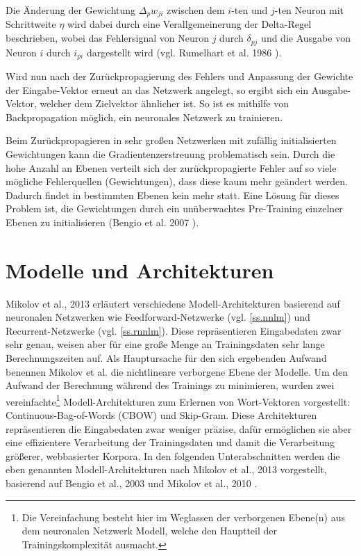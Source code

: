 Die Änderung der Gewichtung $\Delta_pw_{ji}$ zwischen dem $i$-ten und $j$-ten Neuron mit Schrittweite $\eta$ wird dabei durch eine Verallgemeinerung der Delta-Regel beschrieben, wobei das Fehlersignal von Neuron $j$ durch $\delta_{pj}$ und die Ausgabe von Neuron $i$ durch $i_{pi}$ dargestellt wird (vgl. Rumelhart et al. 1986 \citep{Rumelhart1986}).

Wird nun nach der Zurückpropagierung des Fehlers und Anpassung der Gewichte der Eingabe-Vektor erneut an das Netzwerk angelegt, so ergibt sich ein Ausgabe-Vektor, welcher dem Zielvektor ähnlicher ist. So ist es mithilfe von Backpropagation möglich, ein neuronales Netzwerk zu trainieren.

Beim Zurückpropagieren in sehr großen Netzwerken mit zufällig initialisierten Gewichtungen kann die Gradientenzerstreuung problematisch sein. Durch die hohe Anzahl an Ebenen verteilt sich der zurückpropagierte Fehler auf so viele mögliche Fehlerquellen (Gewichtungen), dass diese kaum mehr geändert werden. Dadurch findet in bestimmten Ebenen kein  mehr statt. Eine Lösung für dieses Problem ist, die Gewichtungen durch ein unüberwachtes Pre-Training einzelner Ebenen zu initialisieren (Bengio et al. 2007 \citep{Bengio2007}).

\section{Modelle und Architekturen}\label{s.modelle}
Mikolov et al., 2013 \cite{Mikolov2013} erläutert verschiedene Modell-Architekturen basierend auf neuronalen Netzwerken wie Feedforward-Netzwerke (vgl. \autoref{ss.nnlm}) und Recurrent-Netzwerke (vgl. \autoref{ss.rnnlm}). Diese repräsentieren Eingabedaten zwar sehr genau, weisen aber für eine große Menge an Trainingsdaten sehr lange Berechnungszeiten auf. Als Hauptursache für den sich ergebenden Aufwand benennen Mikolov et al. die nichtlineare verborgene Ebene der Modelle. Um den Aufwand der Berechnung während des Trainings zu minimieren, wurden zwei vereinfachte\footnote{Die Vereinfachung besteht hier im Weglassen der verborgenen Ebene(n) aus dem neuronalen Netzwerk Modell, welche den Hauptteil der Trainingskomplexität ausmacht.} Modell-Architekturen zum Erlernen von Wort-Vektoren vorgestellt: Continuous-Bag-of-Words (CBOW) und Skip-Gram. Diese Architekturen repräsentieren die Eingabedaten zwar weniger präzise, dafür ermöglichen sie aber eine effizientere Verarbeitung der Trainingsdaten und damit die Verarbeitung größerer, webbasierter Korpora. In den folgenden Unterabschnitten werden die eben genannten Modell-Architekturen nach Mikolov et al., 2013 \cite{Mikolov2013} vorgestellt, basierend auf Bengio et al., 2003 \citep{Bengio2003} und Mikolov et al., 2010 \citep{Mikolov2010}.

